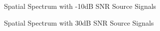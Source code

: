 \documentclass[conference]{IEEEtran}
\begin{document}
		\begin{figure}
			\centerline{}
			\caption{Spatial Spectrum with -10dB SNR Source Signals}
			\label{fig::spatial_spectrum_snr_minus_10db}
		\end{figure}
		
		\begin{figure}
			\centerline{}
			\caption{Spatial Spectrum with 30dB SNR Source Signals}
			\label{fig::spatial_spectrum_snr_30db}
		\end{figure}
		
\end{document}
